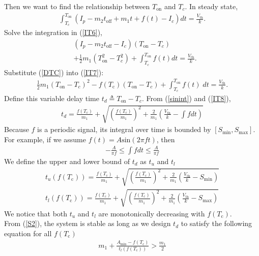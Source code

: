 Then we want to find the relationship between $T_{\text{on}}$ and $T_c$.
In steady state, 
\begin{align} \label{IT6}
\int_{T_c}^{T_{\text{on}}} \left(I_p - m_2t_{\text{off}} + m_1 t + f(t) - I_c \right) dt = \frac{V_{\text{th}}}{k}.
\end{align}
Solve the integration in (\ref{IT6}),
\begin{align} \label{IT7}
&(I_p - m_2t_{\text{off}} - I_c) (T_{\text{on}} - T_c)  \nonumber \\
&+ \frac{1}{2}m_1 (T^2_{\text{on}} -  T^2_c) + \int_{T_c}^{T_{\text{on}}} f(t) dt  = \frac{V_{\text{th}}}{k}.
\end{align}
Substitute (\ref{DTC}) into (\ref{IT7}):
\begin{align} \label{IT8}
\frac{1}{2}m_1 (T_{\text{on}} - T_c)^2 - f(T_{\text{c}})(T_{\text{on}} - T_c) + \int_{T_c}^{T_{\text{on}}} f(t)\; dt  = \frac{V_{\text{th}}}{k}.
\end{align}
Define this variable delay time $t_d \triangleq T_{\text{on}} - T_c $. From (\ref{sinint}) and (\ref{IT8}),
\begin{align}
t_d = \frac{f(T_{\text{c}})}{m_1} + \sqrt{\left(\frac{f(T_{\text{c}})}{m_1}\right)^2+\frac{2}{m_1}\left(\frac{V_{\text{th}}}{k}-\int f dt \right)}
\end{align}
Because $f$ is a periodic signal, its integral over time is bounded by $[S_{\text{min}}, S_{\text{max}}]$. For example, if we assume $f(t) = A \text{sin}(2\pi f t)$, then 
\begin{align} \label{sinint}
- \frac{A}{\pi f } \leq  \int f dt \leq \frac{A}{\pi f }
\end{align}
We define the upper and lower bound of $t_d$ as $t_u$ and $t_l$
\begin{align}
t_u (f(T_{\text{c}}))= \frac{f(T_{\text{c}})}{m_1} + \sqrt{\left(\frac{f(T_{\text{c}})}{m_1}\right)^2+\frac{2}{m_1}\left(\frac{V_{\text{th}}}{k}-S_{\text{min}} \right)} \nonumber \\
t_l (f(T_{\text{c}}))= \frac{f(T_{\text{c}})}{m_1} + \sqrt{\left(\frac{f(T_{\text{c}})}{m_1}\right)^2+\frac{2}{m_1}\left(\frac{V_{\text{th}}}{k}-S_{\text{max}} \right)}
\end{align}
We notice that both $t_u$ and $t_l$ are monotonically decreasing with $f(T_{\text{c}})$.\\
From (\ref{S2}), the system is stable as long as we design $t_d$ to satisfy the following equation for all $f(T_{\text{c}})$ 
\begin{align} \label{CT1}
m_1 + \frac{A_{\text{min}}-f(T_{\text{c}})}{t_l(f(T_{\text{c}}))} > \frac{m_1}{2}
\end{align}
